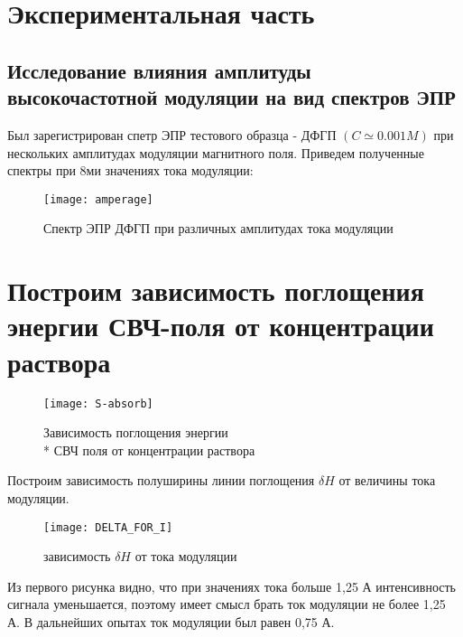 \documentclass[a4paper,12pt]{article}
\begin{document}
\newpage
	
	\section{Экспериментальная часть}
	
	\subsection{Исследование влияния амплитуды высокочастотной модуляции на вид спектров ЭПР}
	
	Был зарегистрирован спетр ЭПР тестового образца - ДФГП $(C\simeq 0.001 M)$ при нескольких амплитудах модуляции магнитного поля. Приведем полученные спектры при 8ми значениях тока модуляции:
	
	\begin{figure}[H]
		\begin{center}
			\texttt{[image: amperage]}
			\caption{Спектр ЭПР ДФГП при различных амплитудах тока модуляции}
		\end{center}
	\end{figure}
		
	
	\section{ Построим зависимость поглощения энергии СВЧ-поля от
концентрации раствора}
	    
	\begin{figure}[H]
		\begin{center}
			\texttt{[image: S-absorb]}
			\caption{Зависимость поглощения энергии\\*
СВЧ поля от концентрации раствора}
		\end{center}
	\end{figure}
    
	Построим зависимость полуширины линии поглощения $\delta H$ от величины тока модуляции.
\newpage
	\begin{figure}[H]
		\begin{center}
			\texttt{[image: DELTA\_FOR\_I]}
			\caption{зависимость $\delta H$ от  тока модуляции}
		\end{center}
	\end{figure}
	
	Из первого рисунка видно, что при значениях тока больше 1,25 А интенсивность сигнала уменьшается, поэтому имеет смысл брать ток модуляции не более 1,25 А. В дальнейших опытах ток модуляции был равен  0,75 А.
\end{document}
